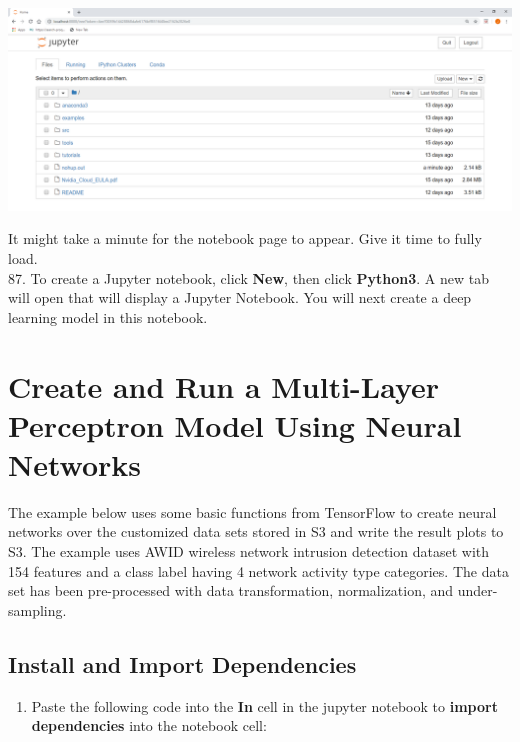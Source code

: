 \documentclass[]{book}
\providecommand{\tightlist}{%
  \setlength{\itemsep}{0pt}\setlength{\parskip}{0pt}}
\begin{document}
\includegraphics{./images/jupyter.png}

It might take a minute for the notebook page to appear. Give it time to fully load.\\
87. To create a Jupyter notebook, click \textbf{New}, then click \textbf{Python3}. A new tab will open that will display a Jupyter Notebook. You will next create a deep learning model in this notebook.

\hypertarget{create-and-run-a-multi-layer-perceptron-model-using-neural-networks}{%
\chapter{Create and Run a Multi-Layer Perceptron Model Using Neural Networks}\label{create-and-run-a-multi-layer-perceptron-model-using-neural-networks}}

The example below uses some basic functions from TensorFlow to create neural networks over the customized data sets stored in S3 and write the result plots to S3. The example uses AWID wireless network intrusion detection dataset with 154 features and a class label having 4 network activity type categories. The data set has been pre-processed with data transformation, normalization, and under-sampling.

\hypertarget{install-and-import-dependencies}{%
\section{Install and Import Dependencies}\label{install-and-import-dependencies}}

\begin{enumerate}
\def\labelenumi{\arabic{enumi}.}
\setcounter{enumi}{87}
\tightlist
\item
  Paste the following code into the \textbf{In} cell in the jupyter notebook to \textbf{import dependencies} into the notebook cell:
\end{enumerate}
\end{document}
